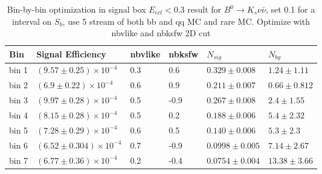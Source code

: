 \begin{table}[h]
\small
\begin{center}
\begin{tabular}{ |p{0.8cm}||p{3.7cm}||p{1.2cm}||p{1.2cm}||p{2.6cm}||p{2.7cm}| }
\hline
 Bin & Signal Efficiency & nbvlike & nbksfw & $N_{sig}$ & $N_{bg}$  \\
 \hline
 bin 1  & $(9.57 \pm 0.25) \times 10^{-4}$ &0.3&0.6&$0.329\pm 0.008 $  &$1.24\pm 1.11 $\\ %
 \hline
 bin 2  & $(6.9 \pm 0.22)\times 10^{-4}$ &0.6& 0.9&$0.211 \pm 0.007 $&$0.66\pm 0.812 $\\ %
 \hline
 bin 3  & $(9.97 \pm 0.28)\times 10^{-4}$ &0.5&-0.9&$0.267 \pm 0.008 $&$2.4\pm 1.55 $\\ %
 \hline
 bin 4  & $(8.15\pm 0.28)\times 10^{-4}$ &0.5&0.2&$0.188 \pm 0.006 $&$5.4\pm 2.32 $ \\ %
 \hline
 bin 5  & $(7.28\pm 0.29) \times 10^{-4}$ &0.6& 0.5&$0.140 \pm 0.006 $&$5.3\pm 2.3 $ \\ %
 \hline
 bin 6  & $(6.52\pm 0.304) \times 10^{-4}$ &0.7& -0.9&$0.0998\pm 0.005 $&$7.14 \pm 2.67 $\\ %
 \hline
 bin 7  & $(6.77 \pm 0.36)\times 10^{-4}$ &0.2&-0.4&$0.0754 \pm 0.004 $&$ 13.38\pm 3.66 $ \\ %
 \hline
 \hline
\end{tabular}
\caption{Bin-by-bin optimization in signal box $E_{ecl} < 0.3$ result for $B^0 \rightarrow K_s \nu \bar{\nu}$, set 0.1 for a interval on $S_b$, use 5 stream of both bb and qq MC and rare MC. Optimize with nbvlike and nbksfw 2D cut } \label{t:optks}
\end{center}
\end{table}


